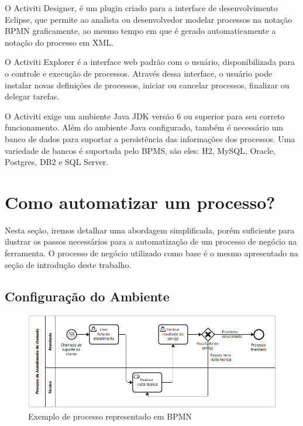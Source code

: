 O Activiti Designer, é um plugin criado para a interface de desenvolvimento Eclipse, que permite ao analista ou desenvolvedor modelar processos na notação BPMN graficamente, ao mesmo tempo em que é gerado automaticamente a notação do processo em XML.

O Activiti Explorer é a interface web padrão com o usuário, disponibilizada para o controle e execução de processos. Através dessa interface, o usuário pode instalar novas definições de processos, iniciar ou cancelar processos, finalizar ou delegar tarefas.

O Activiti exige um ambiente Java JDK versão 6 ou superior para seu correto funcionamento. Além do ambiente Java configurado, também é necessário um banco de dados para suportar a persistência das informações dos processos. Uma variedade de bancos é suportada pelo BPMS, são eles: H2, MySQL, Oracle, Postgres, DB2 e SQL Server.


\section{Como automatizar um processo?}\label{sec:activiti-automatizar_processo}

Nesta seção, iremos detalhar uma abordagem simplificada, porém suficiente para ilustrar os passos necessários para a automatização de um processo de negócio na ferramenta.  O processo de negócio utilizado como base é o mesmo apresentado na seção de introdução deste trabalho.

\subsection{Configuração do Ambiente}\label{sec:activiti-automatizar_processo_configuracao}

\begin{figure}
  \centering
  \includegraphics[width=1.0\textwidth]{imagens/bpmn_example.png}
  \caption{Exemplo de processo representado em BPMN}
  \label{fig:exemplo_bpmn}
\end{figure}

